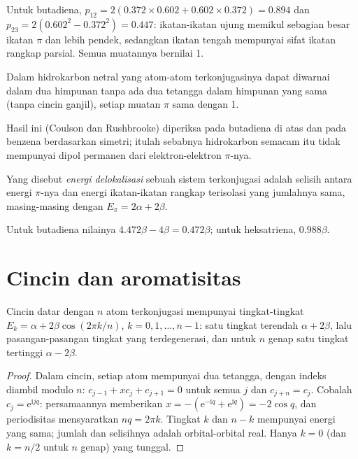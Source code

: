 Untuk butadiena, $p_{12} = 2(0.372 \times 0.602 + 0.602 \times 0.372) = 0.894$
dan $p_{23} =
2(0.602^2 - 0.372^2) = 0.447$: ikatan-ikatan ujung memikul
sebagian besar ikatan $\pi$ dan lebih pendek, sedangkan ikatan tengah
mempunyai sifat ikatan rangkap parsial. Semua muatannya bernilai 1.

\begin{proposition}\label{prop:b2:huckel:alternant}
Dalam hidrokarbon netral yang atom-atom terkonjugasinya dapat diwarnai
dalam dua himpunan tanpa ada dua tetangga dalam himpunan yang sama (tanpa
cincin ganjil), setiap muatan $\pi$ sama dengan 1.
\end{proposition}

\admitted

Hasil ini (Coulson dan Rushbrooke) diperiksa pada butadiena di atas dan
pada benzena berdasarkan simetri; itulah sebabnya hidrokarbon semacam itu
tidak mempunyai dipol permanen dari elektron-elektron $\pi$-nya.

\begin{definition}\label{def:b2:huckel:delocalisation}
Yang disebut \emph{energi delokalisasi} sebuah
sistem terkonjugasi adalah selisih antara energi $\pi$-nya dan energi
ikatan-ikatan rangkap terisolasi yang jumlahnya sama, masing-masing
dengan $E_\pi = 2\alpha + 2\beta$.
\end{definition}

Untuk butadiena nilainya $4.472\beta - 4\beta = 0.472\beta$; untuk heksatriena, $0.988\beta$.

\section{Cincin dan aromatisitas}

\begin{theorem}\label{thm:b2:huckel:ring}
Cincin datar dengan $n$ atom terkonjugasi mempunyai tingkat-tingkat
$E_k = \alpha + 2\beta\cos(2\pi k/n)$, $k = 0, 1, \dots, n - 1$: satu tingkat
terendah $\alpha + 2\beta$, lalu pasangan-pasangan tingkat yang
terdegenerasi, dan untuk $n$ genap satu tingkat tertinggi $\alpha - 2\beta$.
\end{theorem}

\begin{proof}
Dalam cincin, setiap atom mempunyai dua tetangga, dengan indeks diambil
modulo $n$: $c_{j-1} + xc_j + c_{j+1} = 0$ untuk semua $j$ dan $c_{j+n} = c_j$.
Cobalah $c_j = \mathrm e^{\mathrm
i jq}$: persamaannya memberikan $x = -(\mathrm e^{-\mathrm iq} + \mathrm e^{\mathrm iq}) = -2\cos q$,
dan periodisitas mensyaratkan $nq = 2\pi k$. Tingkat $k$ dan $n - k$
mempunyai energi yang sama; jumlah dan selisihnya adalah orbital-orbital
real. Hanya $k = 0$ (dan $k = n/2$ untuk $n$ genap) yang tunggal.
\end{proof}

